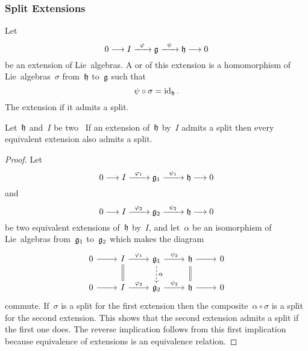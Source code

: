 \subsubsection{Split Extensions}

\begin{definition}
  Let
  \[
    0
    \to
    I
    \xto{\varphi}
    \glie
    \xto{\psi}
    \hlie
    \to
    0
  \]
  be an extension of Lie~algebras.
  A  or  of this extension is a homomorphism of Lie~algebras~$\sigma$ from~$\mathfrak{h}$ to~$\mathfrak{g}$ such that
  \[
    \psi \circ \sigma
    =
    \mathrm{id}_{\mathfrak{h}} \,.
  \]
  The extension  if it admits a split.
\end{definition}


\begin{lemma}
  \label{having a section is invariant under equivalence of extensions}
  Let~$\mathfrak{h}$ and~$I$ be two~\liealgebras{$\kf$}
  If an extension of~$\mathfrak{h}$ by~$I$ admits a split then every equivalent extension also admits a split.
\end{lemma}


\begin{proof}
  Let
  \[
    0
    \to
    I
    \xto{\varphi_1}
    \glie_1
    \xto{\psi_1}
    \hlie
    \to
    0
  \]
  and
  \[
    0
    \to
    I
    \xto{\varphi_2}
    \glie_2
    \xto{\psi_2}
    \hlie
    \to
    0
  \]
  be two equivalent extensions of~$\mathfrak{h}$ by~$I$, and let~$\alpha$ be an isomorphism of Lie~algebras from~$\mathfrak{g}_1$ to~$\mathfrak{g}_2$ which makes the diagram
  \[
    \begin{tikzcd}
      0
      \arrow{r}
      &
      I
      \arrow{r}[above]{\varphi_1}
      \arrow[equal]{d}
      &
      \glie_1
      \arrow{r}[above]{\psi_2}
      \arrow[dashed]{d}[right]{\alpha}
      &
      \hlie
      \arrow{r}
      \arrow[equal]{d}
      &
      0
      \\
      0
      \arrow{r}
      &
      I
      \arrow{r}[above]{\varphi_2}
      &
      \glie_2
      \arrow{r}[above]{\psi_2}
      &
      \hlie
      \arrow{r}
      &
      0
    \end{tikzcd}
  \]
  commute.
  If~$\sigma$ is a split for the first extension then the composite~$\alpha \circ \sigma$ is a split for the second extension.
  This shows that the second extension admits a split if the first one does.
  The reverse implication follows from this first implication because equivalence of extensions is an equivalence relation.
\end{proof}


